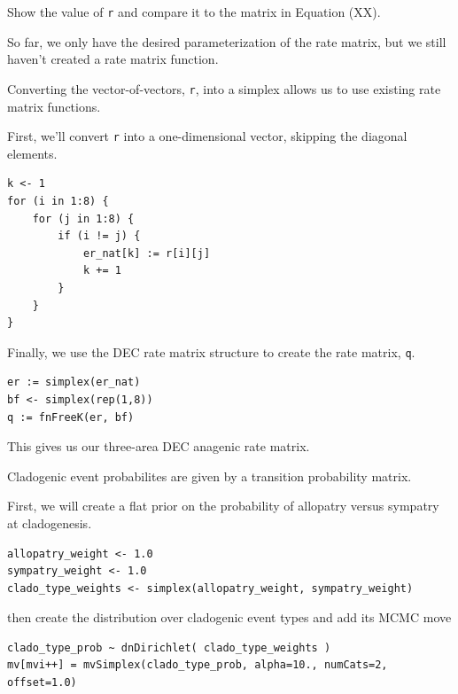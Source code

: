 Show the value of {\tt r} and compare it to the matrix in Equation (XX).

So far, we only have the desired parameterization of the rate matrix, but we still haven't created a rate matrix function.

Converting the vector-of-vectors, {\tt r}, into a simplex allows us to use existing rate matrix functions.

First, we'll convert {\tt r} into a one-dimensional vector, skipping the diagonal elements.

\begin{snugshade}
\begin{lstlisting}
k <- 1
for (i in 1:8) {
    for (j in 1:8) {
        if (i != j) {
            er_nat[k] := r[i][j]
            k += 1
        }
    }
}
\end{lstlisting}
\end{snugshade}

Finally, we use the DEC rate matrix structure to create the rate matrix, {\tt q}.

\begin{snugshade}
\begin{lstlisting}
er := simplex(er_nat)
bf <- simplex(rep(1,8))
q := fnFreeK(er, bf)
\end{lstlisting}
\end{snugshade}

This gives us our three-area DEC anagenic rate matrix.

Cladogenic event probabilites are given by a transition probability matrix.

First, we will create a flat prior on the probability of allopatry versus sympatry at cladogenesis.

\begin{snugshade}
\begin{lstlisting}
allopatry_weight <- 1.0
sympatry_weight <- 1.0
clado_type_weights <- simplex(allopatry_weight, sympatry_weight)
\end{lstlisting}
\end{snugshade}

then create the distribution over cladogenic event types and add its MCMC move

\begin{snugshade}
\begin{lstlisting}
clado_type_prob ~ dnDirichlet( clado_type_weights )
mv[mvi++] = mvSimplex(clado_type_prob, alpha=10., numCats=2, offset=1.0)
\end{lstlisting}
\end{snugshade}

